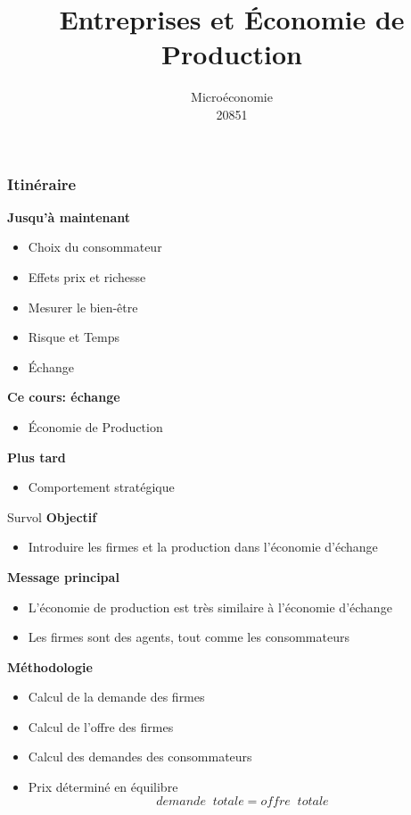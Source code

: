 \documentclass[handout]{beamer}
\title{Entreprises et Économie de Production}
\author{Microéconomie \\ 20851}
\date{}
\newenvironment{iPar}[1]{\textbf{#1} \begin{itemize}}{\end{itemize}}
\newcommand{\mdp}{\medskip \pause}
\begin{document}
\frame{\titlepage}

\section[Outline]{}
\frame{\tableofcontents}

\section{}


\begin{frame}\frametitle{Itinéraire}

\begin{iPar}{Jusqu'à maintenant}
\item Choix du consommateur
\item Effets prix et richesse
\item Mesurer le bien-être
\item Risque et Temps
\item Échange
\end{iPar}\mdp

\begin{iPar}{Ce cours: échange}
\item Économie de Production
\end{iPar}\mdp

\begin{iPar}{Plus tard}
\item  Comportement stratégique
\end{iPar}


\end{frame}

\begin{frame}{Survol} \textbf{Objectif} \begin{itemize} \item Introduire les firmes et la production dans l'économie d'échange  \end{itemize} \mdp
\textbf{Message principal} \begin{itemize} \item L'économie de production est très similaire à l'économie d'échange \item Les firmes sont des agents, tout comme les consommateurs \end{itemize} \mdp
\textbf{Méthodologie}\begin{itemize} \item Calcul de la demande des firmes \item Calcul de l'offre des firmes \item Calcul des demandes des consommateurs \item Prix déterminé en équilibre $$demande \;\; totale  = offre \;\; totale $$\end{itemize}


\end{frame}
\end{document}
